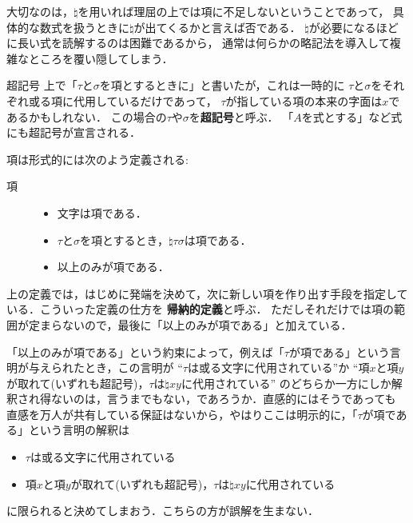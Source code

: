 	大切なのは，$\natural$を用いれば理屈の上では項に不足しないということであって，
	具体的な数式を扱うときに$\natural$が出てくるかと言えば否である．
	$\natural$が必要になるほどに長い式を読解するのは困難であるから，
	通常は何らかの略記法を導入して複雑なところを覆い隠してしまう．
	
	\begin{itembox}[l]{超記号}
		上で「$\tau$と$\sigma$を項とするときに」と書いたが，これは一時的に
		$\tau$と$\sigma$をそれぞれ或る項に代用しているだけであって，
		$\tau$が指している項の本来の字面は$x$であるかもしれない．
		この場合の$\tau$や$\sigma$を{\bf 超記号}と呼ぶ．
		「$A$を式とする」など式にも超記号が宣言される．
	\end{itembox}
	
	項は形式的には次のよう定義される:
	
	\begin{description}
		\item[項]
			\begin{itemize}
				\item 文字は項である．
				\item $\tau$と$\sigma$を項とするとき，$\natural \tau \sigma$は項である．
				\item 以上のみが項である．
			\end{itemize}
	\end{description}
	
	上の定義では，はじめに発端を決めて，次に新しい項を作り出す手段を指定している．こういった定義の仕方を
	{\bf 帰納的定義}と呼ぶ．
	ただしそれだけでは項の範囲が定まらないので，最後に「以上のみが項である」と加えている．
	
	「以上のみが項である」という約束によって，例えば「$\tau$が項である」という言明が与えられたとき，この言明が
	``$\tau$は或る文字に代用されている''か
	``項$x$と項$y$が取れて(いずれも超記号)，$\tau$は$\natural xy$に代用されている''
	のどちらか一方にしか解釈され得ないのは，言うまでもない，であろうか．直感的にはそうであっても
	直感を万人が共有している保証はないから，やはりここは明示的に，「$\tau$が項である」という言明の解釈は
	\begin{itemize}
		\item $\tau$は或る文字に代用されている
		\item 項$x$と項$y$が取れて(いずれも超記号)，$\tau$は$\natural xy$に代用されている
	\end{itemize}
	に限られると決めてしまおう．こちらの方が誤解を生まない．
	
